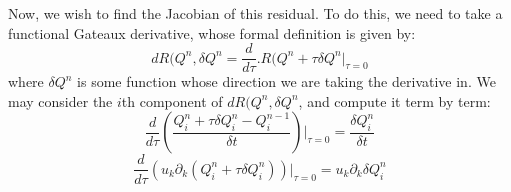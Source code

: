 \documentclass[reqno]{article}
\begin{document}
  Now, we wish to find the Jacobian of this residual.
  To do this, we need to take a functional Gateaux derivative, whose formal
  definition is given by:
  \begin{equation}
    dR(Q^n, \delta Q^n
    =
    \frac{d}{d\tau}
    \bigl. R(Q^n + \tau \delta Q^n \bigr|_{\tau = 0 }
  \end{equation}
  where $\delta Q^n$ is some function whose direction we are taking the
  derivative in.
  We may consider the $i$th component of $dR(Q^n, \delta Q^n$, and compute
  it term by term:
  \begin{equation}
    \frac{d}{d\tau} \left(
      \frac{Q^n_i + \tau \delta Q^n_i - Q^{n - 1}_i}{\delta t}
    \right) \biggl|_{\tau = 0}
    =
    \frac{\delta Q^n_i}{\delta t}
  \end{equation}
  \begin{equation}
    \frac{d}{d\tau} \left(
      u_k \partial_k (Q^n_i + \tau \delta Q^n_i)
    \right) \biggr|_{\tau = 0}
    =
    u_k \partial_k \delta Q^n_i
  \end{equation}
  
	
\end{document}
